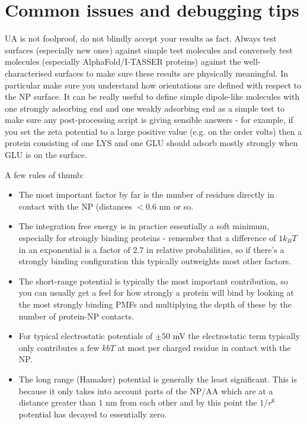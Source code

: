 \documentclass[10pt,a4paper,onecolumn]{report}
\begin{document}
\section{Common issues and debugging tips}
UA is not foolproof, do not blindly accept your results as fact. Always test surfaces (especially new ones) against simple test molecules and conversely test molecules (especially AlphaFold/I-TASSER proteins) against the well-characterised surfaces to make sure these results are physically meaningful. In particular make sure you understand how orientations are defined with respect to the NP surface. It can be really useful to define simple dipole-like molecules with one strongly adsorbing end and one weakly adsorbing end as a simple test to make sure any post-processing script is giving sensible answers - for example, if you set the zeta potential to a large positive value (e.g. on the order volts) then a protein consisting of one LYS and one GLU should adsorb mostly strongly when GLU is on the surface.

A few rules of thumb:

\begin{itemize}
\item The most important factor by far is the number of residues directly in contact with the NP (distances $< 0.6 $ nm or so. 
\item The integration free energy is in practice essentially a soft minimum, especially for strongly binding proteins - remember that a difference of $1 k_BT$ in an exponential is a factor of $2.7$ in relative probabilities, so if there's a strongly binding configuration this typically outweights most other factors.
\item The short-range potential is typically the most important contribution, so you can usually get a feel for how strongly a protein will bind by looking at the most strongly binding PMFs and multiplying the depth of these by the number of protein-NP contacts. 
\item For typical electrostatic potentials of $\pm 50$ mV the electrostatic term typically only contributes a few $kbT$ at most per charged residue in contact with the NP. 
\item The long range (Hamaker) potential is generally the least significant. This is because it only takes into account parts of the NP/AA which are at a distance greater than $1$ nm from each other and by this point the $1/r^6$ potential has decayed to essentially zero. 
\end{itemize}
\end{document}
